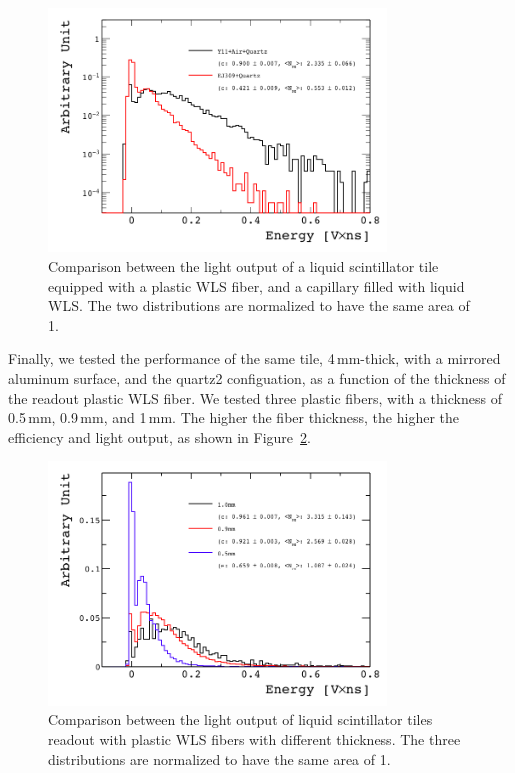 \documentclass[review]{elsarticle}
\begin{document}
\begin{figure}[!ht]
\begin{center}
\includegraphics[width=0.8\textwidth]{./figures/list_RO_FIBER_all_norm.png}
\caption{Comparison between the light output of a liquid scintillator
  tile equipped with a plastic WLS fiber, and a capillary filled with
  liquid WLS. The two distributions are normalized to have the same area of 1.}
\label{fig:y11_vs_cap}
\end{center}
\end{figure}




Finally, we tested the performance of the same tile, 4\,mm-thick, with a
mirrored aluminum surface, and the quartz2 configuation,
as a function of the thickness of the
readout plastic WLS fiber. We tested three plastic fibers, with a
thickness of 0.5\,mm, 0.9\,mm, and 1\,mm. The higher the
fiber thickness, the higher the efficiency and light output, as shown
in Figure~\ref{fig:fiber_thickness_comp}.

\begin{figure}[!ht]
\begin{center}
\includegraphics[width=0.8\textwidth]{./figures/list_Fiber_Thickness_all_1.png}
\caption{Comparison between the light output of liquid scintillator
  tiles readout with plastic WLS fibers with different thickness. The
  three distributions are normalized to have the same area of 1.}
\label{fig:fiber_thickness_comp}
\end{center}
\end{figure}
\end{document}
